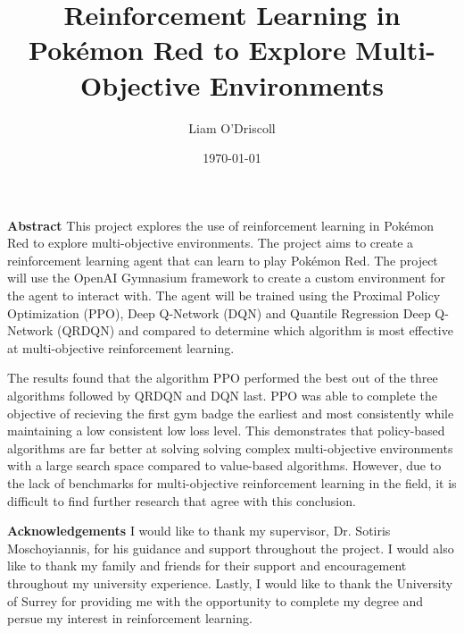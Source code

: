 \documentclass[11pt]{surrey_disso_style}
\title{Reinforcement Learning in Pokémon Red to Explore Multi-Objective Environments}
\author{Liam O'Driscoll}
\date{\today}
\begin{document}
\maketitle


\noindent\LARGE\textbf{Abstract}
\normalsize
\vspace{0.5cm}
\newline
This project explores the use of reinforcement learning in Pokémon Red to explore multi-objective environments. The project aims to create a reinforcement learning agent that can learn to play Pokémon Red. The project will use the OpenAI Gymnasium framework to create a custom environment for the agent to interact with. The agent will be trained using the Proximal Policy Optimization (PPO), Deep Q-Network (DQN) and Quantile Regression Deep Q-Network (QRDQN) and compared to determine which algorithm is most effective at multi-objective reinforcement learning. 

The results found that the algorithm PPO performed the best out of the three algorithms followed by QRDQN and DQN last. PPO was able to complete the objective of recieving the first gym badge the earliest and most consistently while maintaining a low consistent low loss level. This demonstrates that policy-based algorithms are far better at solving solving complex multi-objective environments with a large search space compared to value-based algorithms. However, due to the lack of benchmarks for multi-objective reinforcement learning in the field, it is difficult to find further research that agree with this conclusion.

\noindent\LARGE\textbf{Acknowledgements}
\normalsize
\vspace{0.5cm}
\newline
I would like to thank my supervisor, Dr. Sotiris Moschoyiannis, for his guidance and support throughout the project. I would also like to thank my family and friends for their support and encouragement throughout my university experience. Lastly, I would like to thank the University of Surrey for providing me with the opportunity to complete my degree and persue my interest in reinforcement learning.

\newpage

\tableofcontents











\end{document}
